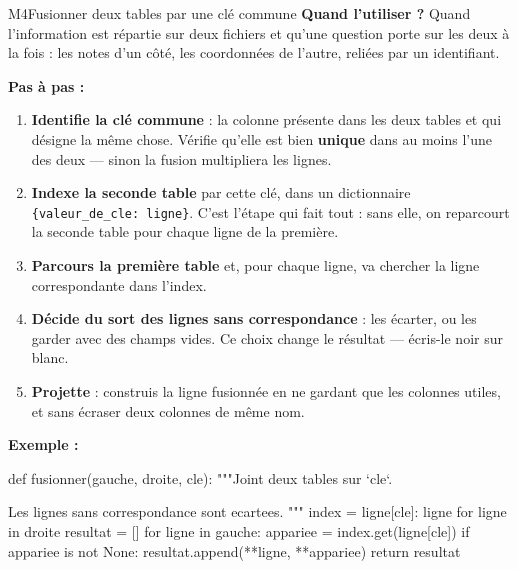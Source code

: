 \begin{fichemethode}{M4}{Fusionner deux tables par une clé commune}
\textbf{Quand l'utiliser ?} Quand l'information est répartie sur deux fichiers et qu'une
question porte sur les deux à la fois : les notes d'un côté, les coordonnées de l'autre,
reliées par un identifiant.

\textbf{Pas à pas :}
\begin{enumerate}
  \item \textbf{Identifie la clé commune} : la colonne présente dans les deux tables et qui
    désigne la même chose. Vérifie qu'elle est bien \textbf{unique} dans au moins l'une des
    deux — sinon la fusion multipliera les lignes.
  \item \textbf{Indexe la seconde table} par cette clé, dans un dictionnaire
    \lstinline!{valeur_de_cle: ligne}!. C'est l'étape qui fait tout : sans elle, on
    reparcourt la seconde table pour chaque ligne de la première.
  \item \textbf{Parcours la première table} et, pour chaque ligne, va chercher la ligne
    correspondante dans l'index.
  \item \textbf{Décide du sort des lignes sans correspondance} : les écarter, ou les garder
    avec des champs vides. Ce choix change le résultat — écris-le noir sur blanc.
  \item \textbf{Projette} : construis la ligne fusionnée en ne gardant que les colonnes
    utiles, et sans écraser deux colonnes de même nom.
\end{enumerate}

\textbf{Exemple :}
\begin{python}
def fusionner(gauche, droite, cle):
    """Joint deux tables sur `cle`.

    Les lignes sans correspondance sont ecartees.
    """
    index = {ligne[cle]: ligne for ligne in droite}
    resultat = []
    for ligne in gauche:
        appariee = index.get(ligne[cle])
        if appariee is not None:
            resultat.append({**ligne, **appariee})
    return resultat
\end{python}


\end{fichemethode}
